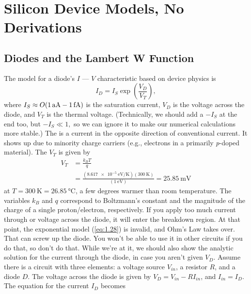 \section{Silicon Device Models, No Derivations}
\subsection{Diodes and the Lambert W Function}
The model for a diode's $I$ --- $V$ characteristic  based on device physics is
\begin{equation}
\label{eq:1.28}
I_{D} = I_{S} \exp \left( \frac{V_{D}}{V_{T}} \right),
\end{equation}
where $I_{S} \approx O(\SI{1}{aA} \-- \SI{1}{fA})$ is the saturation current, $V_{D}$ is the voltage across the diode, and $V_{T}$ is the thermal voltage. (Technically, we should add a $-I_{S}$ at the end too, but $-I_{S} \ll 1,$ so we can ignore it to make our numerical calculations more stable.) The  is a current in the opposite direction of conventional current. It shows up due to minority charge carriers (e.g., electrons in a primarily \textit{p}-doped material). The  $V_{T}$ is given by
\begin{equation}
  \begin{aligned}
\label{eq:1.29}
V_{T} &= \frac{k_{B} T}{q} \\ &= \frac{\left( \SI{8.617e-5}{\electronvolt \per \kelvin} \right) \left( \SI{300}{\kelvin} \right) }{ \left( \SI{1}{\electronvolt} \right) } = \SI{25.85}{\milli \volt}
\end{aligned}
\end{equation}
at $T = \SI{300}{\kelvin} = \SI{26.85}{\celsius}$, a few degrees warmer than room temperature. The variables $k_{B}$ and $q$ correspond to Boltzmann's constant and the magnitude of the charge of a single proton/electron, respectively. If you apply too much current through or voltage across the diode, it will enter the breakdown region. At that point, the exponential model (\ref{eq:1.28}) is invalid, and Ohm's Law takes over. That can screw up the diode. You won't be able to use it in other circuits if you do that, so don't do that.
While we're at it, we should also show the analytic solution for the current through the diode, in case you aren't given $V_{D}$. Assume there is a circuit with three elements: a voltage source $V_{in}$, a resistor $R$, and a diode $D$. The voltage across the diode is given by $V_{D} = V_{in} - R I_{in}$, and $I_{in} = I_{D}$. The equation for the current $I_{D}$ becomes

